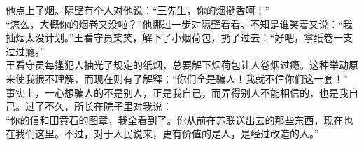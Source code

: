 他点上了烟。隔壁有个人对他说：“王先生，你的烟挺香呵！”\\

“怎么，大概你的烟卷又没啦？”他挪过一步对隔壁看看。不知是谁笑着又说：“我抽烟太没计划。”王看守员笑笑，解下了小烟荷包，扔了过去：“好吧，拿纸卷一支过过瘾。”\\

王看守员每逢犯人抽光了规定的纸烟，总要解下烟荷包让人卷烟过瘾。这种举动原来使我很不理解，而现在则有了解释：“你们全是骗人！我就不信你们这一套！”\\

事实上，一心想骗人的不是别人，正是我自己，而弄得别人不能相信的，也是我自己。过了不久，所长在院子里对我说：\\

“你的信和田黄石的图章，我全看到了。你从前在苏联送出去的那些东西，现在也在我们这里。不过，对于人民说来，更有价值的是人，是经过改造的人。”